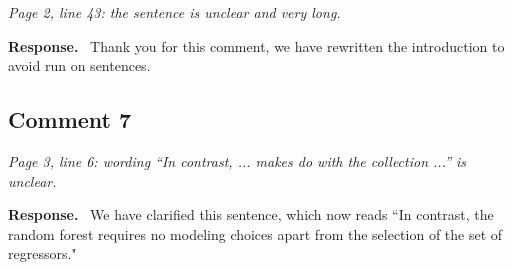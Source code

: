 \documentclass[12pt]{article}
\newcommand{\comment}[1]{\begin{refbox}\itshape #1\end{refbox}}
\newcommand{\response}{\medskip\noindent\textbf{Response.}\ }
\begin{document}
\comment{Page 2, line 43: the sentence is unclear and very long.}

\response
Thank you for this comment, we have rewritten the introduction to avoid run on sentences.

\subsection*{Comment 7}

\comment{Page 3, line 6: wording ``In contrast, ... makes do with the
collection ...'' is unclear.}

\response
We have clarified this sentence, which now reads ``In contrast, the random forest requires no modeling choices apart from the selection of the set of regressors."



\end{document}
